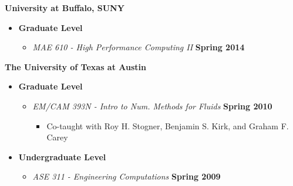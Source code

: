\textbf{University at Buffalo, SUNY}
\begin{itemize}
\item[] \textbf{Graduate Level}
  \begin{itemize}
  \item[] \textit{MAE 610 - High Performance Computing II} \hfill \textbf{Spring 2014}
  \end{itemize}
\end{itemize}

\textbf{The University of Texas at Austin}
\begin{itemize}
\item[] \textbf{Graduate Level}
  \begin{itemize}
  \item[] \textit{EM/CAM 393N - Intro to Num. Methods for Fluids}%
    \hfill \textbf{Spring 2010}
    \begin{itemize}
    \item Co-taught with Roy H. Stogner, Benjamin S. Kirk, and Graham F. Carey
    \end{itemize}
  \end{itemize}
\item[] \textbf{Undergraduate Level}
  \begin{itemize}
  \item[] \textit{ASE 311 - Engineering Computations}%
    \hfill \textbf{Spring 2009}
  \end{itemize}
\end{itemize}
